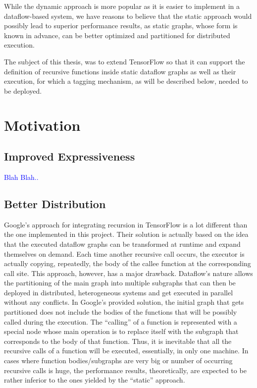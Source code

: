 \documentclass[ack,preface]{dithesis}
\begin{document}
While the dynamic approach is more popular as it is easier to implement in a dataflow-based system,  we have reasons to believe that the static approach would possibly lead to superior performance results, as static graphs, whose form is known in advance, can  be better optimized and partitioned  for distributed execution.

The subject of this thesis, was to extend TensorFlow so that it can support the definition of recursive functions inside static dataflow graphs as well as their execution, for which a tagging mechanism, as will be described below, needed to be deployed.


    \section{Motivation}

    \subsection{Improved Expressiveness}
	 \textcolor{blue}{Blah Blah..}

    \subsection{Better Distribution}
	Google’s approach for integrating recursion in TensorFlow is a lot different than the one implemented in this project. Their solution is actually based on the idea that the executed dataflow graphs can be transformed at runtime and expand themselves on demand. Each time another recursive call occurs, the executor is actually copying, repeatedly, the body of the callee function at the corresponding call site. This approach, however, has a major drawback. Dataflow’s nature allows the partitioning of the main graph into multiple subgraphs that can then be deployed in distributed, heterogeneous systems and get executed in parallel without any conflicts. In Google’s provided solution, the initial graph that gets partitioned does not include the bodies of the functions that will be possibly called during the execution. The “calling” of a function is represented with a special node whose main operation is to replace itself with the subgraph that corresponds to the body of that function. Thus, it is inevitable that all the recursive calls of a function will be executed, essentially, in only one machine.  In cases where function bodies/subgraphs are very big or number of occurring recursive calls is huge, the performance results, theoretically, are expected to be rather inferior to the ones yielded by the “static” approach.
\end{document}
